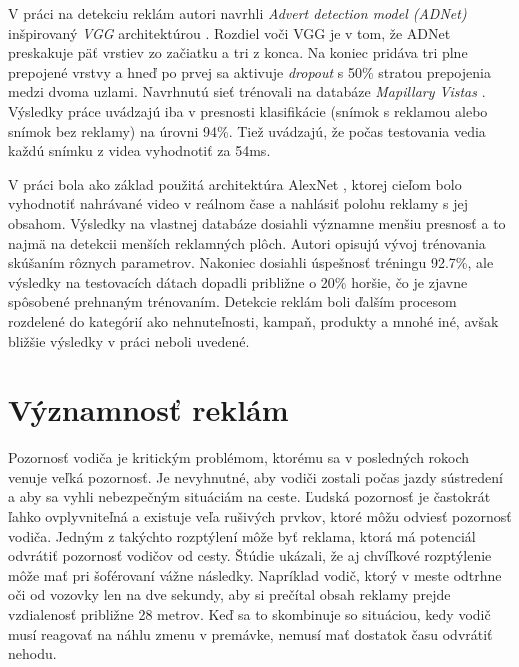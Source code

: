 
V práci \cite{Hossari} na detekciu reklám autori navrhli \textit{Advert detection model (ADNet)} inšpirovaný \textit{VGG} architektúrou \cite{simonyan2015deep}. Rozdiel voči VGG je v tom, že ADNet preskakuje päť vrstiev zo začiatku a tri z konca. Na koniec pridáva tri plne prepojené vrstvy a hneď po prvej sa aktivuje \textit{dropout} s 50\% stratou prepojenia medzi dvoma uzlami. Navrhnutú sieť trénovali na databáze \textit{Mapillary Vistas} \cite{Mapillary}. Výsledky práce uvádzajú iba v presnosti klasifikácie (snímok s reklamou alebo snímok bez reklamy) na úrovni 94\%. Tiež uvádzajú, že počas testovania vedia každú snímku z videa vyhodnotiť za 54ms.

V práci \cite{GeoTag} bola ako základ použitá architektúra AlexNet \cite{AlexNet}, ktorej cieľom bolo vyhodnotiť nahrávané video v reálnom čase a nahlásiť polohu reklamy s jej obsahom. Výsledky na vlastnej databáze dosiahli významne menšiu presnosť a to najmä na detekcii menších reklamných plôch. Autori opisujú vývoj trénovania skúšaním rôznych parametrov. Nakoniec dosiahli úspešnosť tréningu 92.7\%, ale výsledky na testovacích dátach dopadli približne o 20\% horšie, čo je zjavne spôsobené prehnaným trénovaním. Detekcie reklám boli ďalším procesom rozdelené do kategórií ako nehnuteľnosti, kampaň, produkty a mnohé iné, avšak bližšie výsledky v práci neboli uvedené.


\section{Významnosť reklám}

Pozornosť vodiča je kritickým problémom, ktorému sa v posledných rokoch venuje veľká pozornosť. Je nevyhnutné, aby vodiči zostali počas jazdy sústredení  a aby sa vyhli nebezpečným situáciám na ceste. Ľudská pozornosť je častokrát ľahko ovplyvniteľná a existuje veľa rušivých prvkov, ktoré môžu odviesť pozornosť vodiča. Jedným z takýchto rozptýlení môže byť reklama, ktorá má potenciál odvrátiť pozornosť vodičov od cesty. Štúdie ukázali, že aj chvíľkové rozptýlenie môže mať pri šoférovaní vážne následky. Napríklad vodič, ktorý v meste odtrhne oči od vozovky len na dve sekundy, aby si prečítal obsah reklamy prejde vzdialenosť približne 28 metrov. Keď sa to skombinuje so situáciou, kedy vodič musí reagovať na náhlu zmenu v premávke, nemusí mať dostatok času odvrátiť nehodu.

